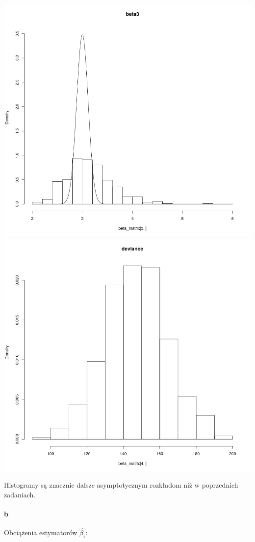 \documentclass[a4paper,11pt]{article}
\begin{document}
\includegraphics[scale=.35]{beta42_3.png} 
\includegraphics[scale=.35]{deviance_42.png} 

Histogramy są znacznie dalsze asymptotycznym rozkładom niż w poprzednich zadaniach. 

\paragraph{b} Obciążenia estymatorów $\widehat{\beta_{i}}$:
\end{document}
